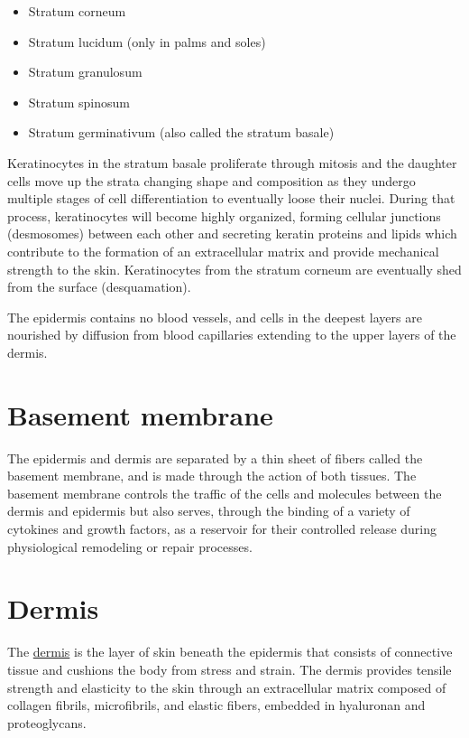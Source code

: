 \begin{itemize}
\tightlist
\item
  Stratum corneum
\item
  Stratum lucidum (only in palms and soles)
\item
  Stratum granulosum
\item
  Stratum spinosum
\item
  Stratum germinativum (also called the stratum basale)
\end{itemize}

Keratinocytes in the stratum basale proliferate through mitosis and the
daughter cells move up the strata changing shape and composition as they
undergo multiple stages of cell differentiation to eventually loose
their nuclei. During that process, keratinocytes will become highly
organized, forming cellular junctions (desmosomes) between each other
and secreting keratin proteins and lipids which contribute to the
formation of an extracellular matrix and provide mechanical strength to
the skin. Keratinocytes from the stratum corneum are eventually shed
from the surface (desquamation).

The epidermis contains no blood vessels, and cells in the deepest layers
are nourished by diffusion from blood capillaries extending to the upper
layers of the dermis.

\section{Basement membrane}\label{basement-membrane}

The epidermis and dermis are separated by a thin sheet of fibers called
the basement membrane, and is made through the action of both tissues.
The basement membrane controls the traffic of the cells and molecules
between the dermis and epidermis but also serves, through the binding of
a variety of cytokines and growth factors, as a reservoir for their
controlled release during physiological remodeling or repair processes.

\section{Dermis}\label{dermis}

The \href{https://en.wikipedia.org/wiki/Dermis}{dermis} is the layer of
skin beneath the epidermis that consists of connective tissue and
cushions the body from stress and strain. The dermis provides tensile
strength and elasticity to the skin through an extracellular matrix
composed of collagen fibrils, microfibrils, and elastic fibers, embedded
in hyaluronan and proteoglycans.

